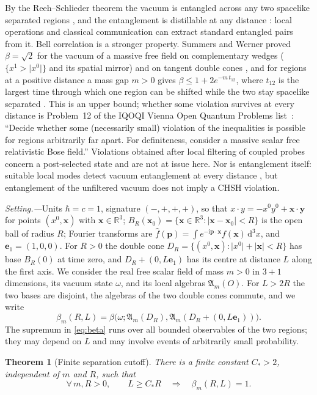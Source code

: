 \documentclass[aps,prl,reprint,longbibliography,raggedbottom]{revtex4-2}
\newtheorem{theorem}{Theorem}
\newcommand{\R}{\mathbb R}
\newcommand{\ii}{\mathrm i}
\newcommand{\dd}{\,\mathrm d}
\newcommand{\abs}[1]{\lvert #1\rvert}
\newcommand{\A}{\mathfrak A}
\newcommand{\bx}{\mathbf x}
\newcommand{\by}{\mathbf y}
\newcommand{\bp}{\mathbf p}
\newcommand{\eone}{\mathbf e_1}
\begin{document}
By the Reeh--Schlieder theorem the vacuum is entangled across any two
spacelike separated regions \cite{HC00}, and the entanglement is
distillable at any distance \cite{VW05}: local operations and
classical communication can extract standard entangled pairs from it.
Bell correlation is a
stronger property. Summers and Werner proved $\beta=\sqrt2$ for the
vacuum of a massive free field on complementary wedges
($\{x^1>\abs{x^0}\}$ and its spatial mirror) and on tangent
double cones \cite{SW85,SW87b,SW87c,SW88}, and for regions at a
positive distance a mass gap $m>0$ gives
$\beta\le1+2e^{-m\,t_{12}}$, where $t_{12}$ is the largest time
through which one region can be shifted while the two stay spacelike
separated \cite{SW87a,Summers11}. This is an upper bound; whether some
violation survives at every distance is Problem~12 of the IQOQI Vienna
Open Quantum Problems list~\cite{OQP12,KW05}: ``Decide whether some
(necessarily small)
violation of the inequalities is possible for regions arbitrarily far
apart. For definiteness, consider a massive scalar free relativistic
Bose field.'' Violations obtained after local filtering of coupled
probes \cite{RRS05,MN20} concern a post-selected state and are not at
issue here. Nor is entanglement itself: suitable local modes
detect vacuum entanglement at every distance \cite{GK25}, but
entanglement of the unfiltered vacuum does not imply a CHSH
violation.

\emph{Setting.---}Units $\hbar=c=1$, signature $(-,+,+,+)$, so that
$x\cdot y=-x^0y^0+\bx\cdot\by$ for points $(x^0,\bx)$ with $\bx\in\R^3$;
$B_R(\bx_0)=\{\bx\in\R^3:\abs{\bx-\bx_0}<R\}$ is the open ball of radius
$R$; Fourier transforms are
$\hat f(\bp)=\int e^{-\ii\bp\cdot\bx}f(\bx)\dd^3x$, and
$\eone=(1,0,0)$. For $R>0$ the double cone
$D_R=\{(x^0,\bx):\abs{x^0}+\abs\bx<R\}$ has base $B_R(0)$ at time zero,
and $D_R+(0,L\eone)$ has its centre at distance $L$ along the first
axis. We consider the real free scalar field of mass $m>0$ in $3+1$
dimensions, its vacuum state $\omega$, and its local algebras
$\A_m(O)$. For $L>2R$ the two bases are disjoint, the algebras of the
two double cones commute, and we write
\[
\beta_m(R,L)=\beta\bigl(\omega;\A_m(D_R),\A_m(D_R+(0,L\eone))\bigr).
\]
The supremum in \eqref{eq:beta} runs over all bounded observables of
the two regions; they may depend on $L$ and may involve events of
arbitrarily small probability.

\begin{theorem}[Finite separation cutoff]\label{thm:main}
There is a finite constant $C_*>2$, independent of $m$ and $R$, such
that
\begin{equation}
\forall\,m,R>0,\qquad
L\ge C_*R\quad\Longrightarrow\quad\beta_m(R,L)=1.
\label{eq:main}
\end{equation}
\end{theorem}
\end{document}

